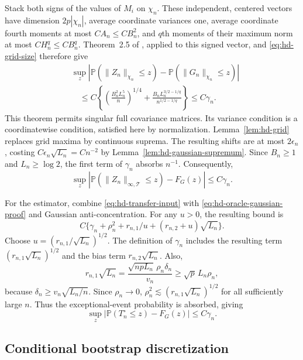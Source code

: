 \documentclass[10pt]{book}
\newcommand{\prob}{\mathbb{P}}
\numberwithin{equation}{section}
\begin{document}
Stack both signs of the values of $M_i$ on $\chi_n$. These independent,
centered vectors have dimension $2p|\chi_n|$, average coordinate variances
one, average coordinate fourth moments at most $CA_n\le CB_n^2$,
and $q$th moments of their maximum norm at most $CH_n^q\le CB_n^q$.
Theorem~2.5 of \citet{chernozhukov_et_al_2022}, applied to this signed
vector, and \eqref{eq:hd-grid-size} therefore give
\[
\begin{aligned}
&\sup_z\left|\prob(\|Z_n\|_{\chi_n}\le z)
             -\prob(\|G_n\|_{\chi_n}\le z)\right|\\
&\quad\le C\left\{\left(\frac{B_n^2L_n^5}{n}\right)^{1/4}
+\frac{B_nL_n^{3/2-1/q}}{n^{1/2-1/q}}\right\}\le C\gamma_n.
\end{aligned}
\]
This theorem permits singular full covariance matrices. Its variance
condition is a coordinatewise condition, satisfied here by normalization.
Lemma~\ref{lem:hd-grid} replaces grid maxima by continuous suprema.
The resulting shifts are at most $2\epsilon_n$, costing
$C\epsilon_n\sqrt{L_n}=Cn^{-2}$ by
Lemma~\ref{lem:hd-gaussian-supremum}. Since $B_n\ge1$ and
$L_n\ge\log2$, the first term of $\gamma_n$ absorbs $n^{-1}$.
Consequently,
\begin{equation}
 \sup_z|\prob(\|Z_n\|_{\infty,\mathcal T}\le z)-F_G(z)|
 \le C\gamma_n.
 \label{eq:hd-oracle-gaussian-proof}
\end{equation}

For the estimator, combine \eqref{eq:hd-transfer-input} with
\eqref{eq:hd-oracle-gaussian-proof} and Gaussian anti-concentration.
For any $u>0$, the resulting bound is
\[
 C\{\gamma_n+\rho_n^2+r_{n,1}/u
                  +(r_{n,2}+u)\sqrt{L_n}\}.
\]
Choose $u=(r_{n,1}/\sqrt{L_n})^{1/2}$. The definition of
$\gamma_n$ includes the resulting term
$(r_{n,1}\sqrt{L_n})^{1/2}$ and the bias term
$r_{n,2}\sqrt{L_n}$. Also,
\[
r_{n,1}\sqrt{L_n}
=\frac{\sqrt{npL_n}\,\rho_n\delta_n}{v_n}
\ge\sqrt p\,L_n\rho_n,
\]
because $\delta_n\ge v_n\sqrt{L_n/n}$. Since $\rho_n\to0$,
$\rho_n^2\lesssim(r_{n,1}\sqrt{L_n})^{1/2}$ for all sufficiently
large $n$. Thus the exceptional-event probability is absorbed, giving
\begin{equation}
 \sup_z|\prob(T_n^\circ\le z)-F_G(z)|\le C\gamma_n.
 \label{eq:hd-estimator-gaussian-proof}
\end{equation}

\subsection{Conditional bootstrap discretization}
\end{document}
